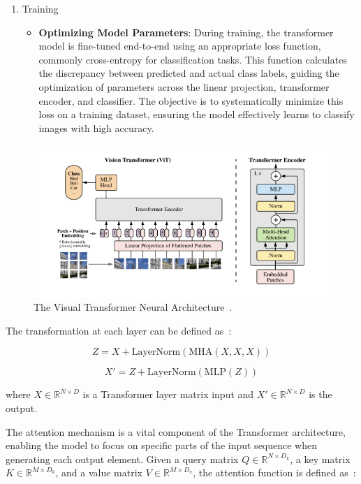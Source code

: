 \documentclass[12pt,a4paper]{report}
\begin{document}
\begin{enumerate}
  \item Training
        \begin{itemize}
          \item \textbf{Optimizing Model Parameters}: During training, the transformer model is fine-tuned end-to-end using an appropriate loss function, commonly cross-entropy for classification tasks. This function calculates the discrepancy between predicted and actual class labels, guiding the optimization of parameters across the linear projection, transformer encoder, and classifier. The objective is to systematically minimize this loss on a training dataset, ensuring the model effectively learns to classify images with high accuracy.
        \end{itemize}
\end{enumerate}

\begin{figure}[th]
  \centering
  \includegraphics[scale=0.8]{./pics/vit.png}
  \caption[The Visual Transformer Neural Architecture]{The Visual Transformer Neural Architecture~\cite{vaswani2017attention, dosovitskiy2020}.}
  \label{fig:p8}
\end{figure}

The transformation at each layer can be defined as~\cite{Comajoan_Cara_2024}:

\begin{equation}
  Z = X + \text{LayerNorm}(\text{MHA}(X, X, X))
\end{equation}

\begin{equation}
  X' = Z + \text{LayerNorm}(\text{MLP}(Z))
\end{equation}

where \( X \in \mathbb{R}^{N \times D} \) is a Transformer layer matrix input and  \( X' \in \mathbb{R}^{N \times D} \) is the output.

The attention mechanism is a vital component of the Transformer architecture, enabling the model to focus on specific parts of the input sequence when generating each output element. Given a query matrix \( Q \in \mathbb{R}^{N \times D_k} \), a key matrix \( K \in \mathbb{R}^{M \times D_k} \), and a value matrix \( V \in \mathbb{R}^{M \times D_v} \), the attention function is defined as~\cite{Comajoan_Cara_2024}:
\end{document}
